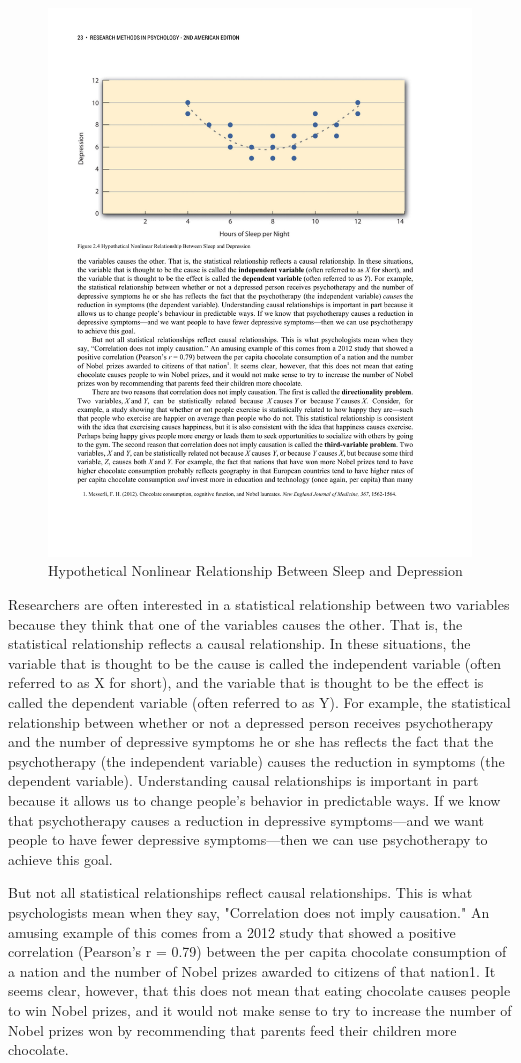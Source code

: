 \begin{figure}
      \includegraphics[width=.75\linewidth]{figures/C2F5Ucurve.pdf}
      \caption{Hypothetical Nonlinear Relationship Between Sleep and Depression}
      \label{fig:Nonlinear}
\end{figure}
Researchers are often interested in a statistical relationship between two variables because they think that one of the variables causes the other. That is, the statistical relationship reflects a causal relationship. In these situations, the variable that is thought to be the cause is called the independent variable (often referred to as X for short), and the variable that is thought to be the effect is called the dependent variable (often referred to as Y). For example, the statistical relationship between whether or not a depressed person receives psychotherapy and the number of depressive symptoms he or she has reflects the fact that the psychotherapy (the independent variable) causes the reduction in symptoms (the dependent variable). Understanding causal relationships is important in part because it allows us to change people's behavior in predictable ways. If we know that psychotherapy causes a reduction in depressive symptoms---and we want people to have fewer depressive symptoms---then we can use psychotherapy to achieve this goal.

But not all statistical relationships reflect causal relationships. This is what psychologists mean when they say, "Correlation does not imply causation." An amusing example of this comes from a 2012 study that showed a positive correlation (Pearson's r = 0.79) between the per capita chocolate consumption of a nation and the number of Nobel prizes awarded to citizens of that nation1. It seems clear, however, that this does not mean that eating chocolate causes people to win Nobel prizes, and it would not make sense to try to increase the number of Nobel prizes won by recommending that parents feed their children more chocolate.

